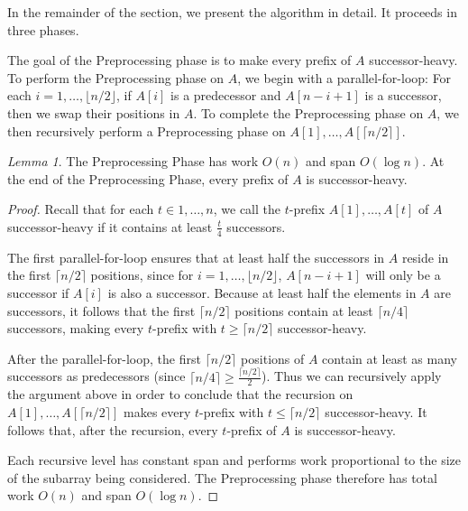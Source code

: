 \documentclass[sigplan, 10pt, nonacm]{acmart}
\renewcommand{\paragraph}[1]{\vspace{0.09in}\noindent{\bf \boldmath #1.}}
\theoremstyle{remark}
\newtheorem{lemma}[thm]{Lemma}
\theoremstyle{remark}
\begin{document}
In the remainder of the section, we present the algorithm in detail.
It proceeds in three phases.

\paragraph{A Preprocessing Phase}
The goal of the Preprocessing phase is to make every prefix of $A$
successor-heavy. To perform the Preprocessing phase on $A$, we begin
with a parallel-for-loop: For each $i = 1, \ldots, \lfloor n /
2\rfloor$, if $A[i]$ is a predecessor and $A[n - i + 1]$ is a
successor, then we swap their positions in $A$. To complete the
Preprocessing phase on $A$, we then recursively perform a
Preprocessing phase on $A[1], \ldots, A[\lceil n / 2 \rceil]$.

\begin{lemma}
 The Preprocessing Phase has work $O(n)$ and span $O(\log n)$. At the
 end of the Preprocessing Phase, every prefix of $A$ is
 successor-heavy.
  \label{lem:preprocessingphase}
\end{lemma}
\begin{proof}
Recall that for each $t \in 1, \ldots, n$, we call the $t$-prefix
$A[1], \ldots, A[t]$ of $A$ successor-heavy if it contains at least
$\frac{t}{4}$ successors.

The first parallel-for-loop ensures that at least half the successors
in $A$ reside in the first $\lceil n / 2 \rceil$ positions, since for
$i = 1, \ldots, \lfloor n / 2 \rfloor$, $A[n - i + 1]$ will only be a
successor if $A[i]$ is also a successor. Because at least half the
elements in $A$ are successors, it follows that the first $\lceil n /
2 \rceil$ positions contain at least $\lceil n / 4\rceil$ successors,
making every $t$-prefix with $t \ge \lceil n / 2 \rceil$
successor-heavy.

After the parallel-for-loop, the first $\lceil n / 2 \rceil$ positions
of $A$ contain at least as many successors as predecessors (since
$\lceil n / 4 \rceil \ge \frac{\lceil n / 2 \rceil}{2}$). Thus we can
recursively apply the argument above in order to conclude that the
recursion on $A[1], \ldots, A[\lceil n / 2 \rceil]$ makes every
$t$-prefix with $t \le \lceil n / 2 \rceil$ successor-heavy. It
follows that, after the recursion, every $t$-prefix of $A$ is
successor-heavy.

Each recursive level has constant span and performs work proportional
to the size of the subarray being considered. The Preprocessing phase
therefore has total work $O(n)$ and span $O(\log n)$.
\end{proof}
\end{document}
